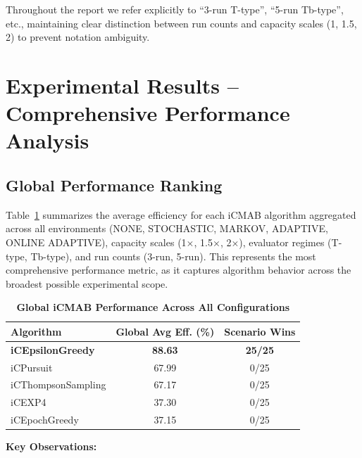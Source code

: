 \documentclass[12pt,a4paper]{article}
\newcommand{\performance}[1]{\textcolor{performancecolor}{\textbf{#1}}}
\begin{document}
Throughout the report we refer explicitly to ``3-run T-type'', ``5-run Tb-type'', etc., maintaining clear distinction between run counts and capacity scales (1, 1.5, 2) to prevent notation ambiguity.

\newpage
\section{Experimental Results – Comprehensive Performance Analysis}

\begin{tcolorbox}[colback=performancecolor!10,colframe=performancecolor,title=\textbf{Primary Performance Results (Aggregated Across All Configurations)}]

\subsection{Global Performance Ranking}

Table~\ref{tab:global-performance} summarizes the average efficiency for each iCMAB algorithm aggregated across all environments (NONE, STOCHASTIC, MARKOV, ADAPTIVE, ONLINE ADAPTIVE), capacity scales (1$\times$, 1.5$\times$, 2$\times$), evaluator regimes (T-type, Tb-type), and run counts (3-run, 5-run). This represents the most comprehensive performance metric, as it captures algorithm behavior across the broadest possible experimental scope.

\begin{table}[H]
\centering
\caption{\performance{Global iCMAB Performance Across All Configurations}}
\label{tab:global-performance}
\begin{tabular}{|l|c|c|}
\hline
\textbf{Algorithm} & \textbf{Global Avg Eff. (\%)} & \textbf{Scenario Wins} \\
\hline
\hline
\performance{iCEpsilonGreedy}   & \performance{\textbf{88.63}} & \performance{25/25} \\
iCPursuit                       & 67.99 & 0/25 \\
iCThompsonSampling              & 67.17 & 0/25 \\
iCEXP4                          & 37.30 & 0/25 \\
iCEpochGreedy                   & 37.15 & 0/25 \\
\hline
\end{tabular}
\end{table}

\textbf{Key Observations:}


\end{tcolorbox}
\end{document}
